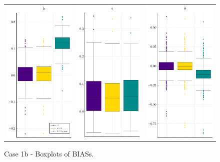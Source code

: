 \begin{figure}[ht]
	\centering \begin{tabular}[b]{c c c}
		\includegraphics[width=.3\textwidth]{Figures/1b/BIAS_b.pdf} & \includegraphics[width=.3\textwidth]{Figures/1b/BIAS_a.pdf} & \includegraphics[width=.3\textwidth]{Figures/1b/BIAS_t.pdf}
	\end{tabular}
\caption{Case 1b - Boxplots of BIASs.}
	\label{fig:bpBIAS1b}
\end{figure}
